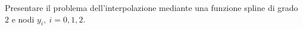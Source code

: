 Presentare il problema dell'interpolazione mediante una funzione 
spline di grado $2$ e  nodi ${y_i}, \ i=0, 1, 2$.
